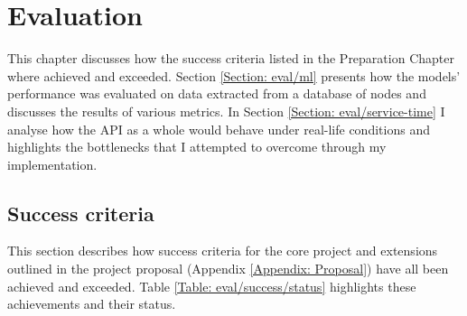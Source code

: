 
	\chapter{Evaluation}
	This chapter discusses how the success criteria listed in the Preparation Chapter where achieved and exceeded.  Section \ref{Section: eval/ml} presents how the models' performance was evaluated on data extracted from a database of nodes and discusses the results of various metrics. In Section \ref{Section: eval/service-time} I analyse how the API as a whole would behave under real-life conditions and highlights the bottlenecks that I attempted to overcome through my implementation.
	\section{Success criteria} \label{Section: eval/success-criteria}
		This section describes how success criteria for the core project and extensions outlined in the project proposal (Appendix \ref{Appendix: Proposal}) have all been achieved and exceeded. Table \ref{Table: eval/success/status} highlights these achievements and their status. 
